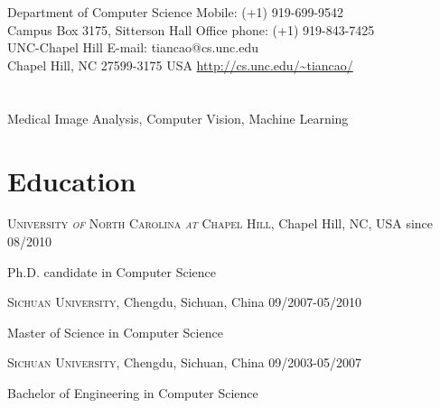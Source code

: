 \documentclass[line,margin]{res}
\newenvironment{list1}{
  \begin{list}{\ding{113}}{%
      \setlength{\itemsep}{0in}
      \setlength{\parsep}{0in} \setlength{\parskip}{0in}
      \setlength{\topsep}{0in} \setlength{\partopsep}{0in} 
      \setlength{\leftmargin}{0.17in}}}{\end{list}}
\begin{document}

\begin{resume}
\section{}
\smallskip
Department of Computer Science  \hfill { Mobile:}  (+1) 919-699-9542 \\
Campus Box 3175, Sitterson Hall  \hfill { Office phone:} (+1) 919-843-7425 \\      
UNC-Chapel Hill \hfill { E-mail:}  tiancao@cs.unc.edu \\
Chapel Hill, NC 27599-3175 USA \hfill  \url{http://cs.unc.edu/~tiancao/} 

\section{}       
\smallskip

Medical Image Analysis, Computer Vision, Machine Learning

\section{\sc Education}
\smallskip

\textsc{University \textit{of} North Carolina \textit{at} Chapel Hill}, Chapel Hill, NC, USA \hfill{since 08/2010}\\
\vspace*{-.15in}
\begin{list1}
\item[] Ph.D. candidate in Computer Science %
\end{list1}
 \vspace*{-.15in}
\textsc{Sichuan University}, Chengdu, Sichuan, China \hfill {09/2007-05/2010}\\
\vspace*{-.15in}
\begin{list1}
\item[] Master of Science in Computer Science  %
\end{list1}
 \vspace*{-.15in}
\textsc{Sichuan University}, Chengdu, Sichuan, China \hfill{09/2003-05/2007}\\
 \vspace*{-.15in}
\begin{list1}
 \item[]  Bachelor of Engineering in Computer Science %
\end{list1}


\end{resume}
\end{document}
